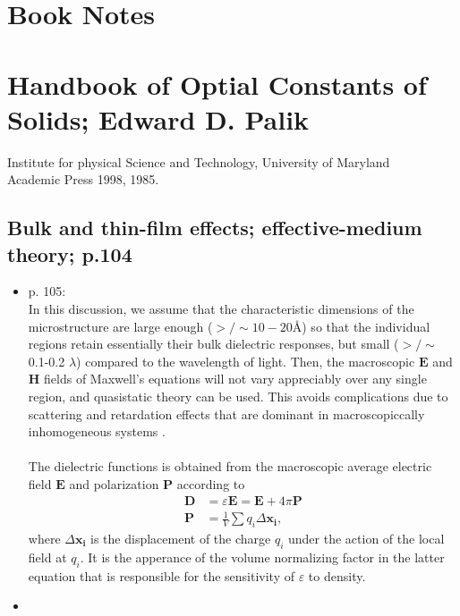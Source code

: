 \section{\textbf{Book Notes}}
\section{Handbook of Optial Constants of Solids; Edward D. Palik}
Institute for physical Science and Technology, University of Maryland\\
Academic Press 1998, 1985.\\

\subsection{Bulk and thin-film effects; effective-medium theory; p.104}
\begin{itemize}
\item p. 105:\\
   In this discussion, we assume that the characteristic dimensions of the microstructure
   are large enough ($>/\sim 10-20 $Å) so that the individual regions retain essentially their bulk dielectric
   responses, but small ($>/\sim$ 0.1-0.2 $\lambda$) compared to the wavelength of light.
   Then, the macroscopic $\boldsymbol E$ and $\boldsymbol H$ fields of Maxwell's equations will not vary
   appreciably over any single region, and quasistatic theory can be used. This avoids complications
   due to scattering and retardation effects that are dominant in macroscopiccally inhomogeneous 
   systems \cite{Beckmann1968}.
   \\
   \\
   The dielectric functions is obtained from the macroscopic average electric field $\boldsymbol E$ and 
   polarization $\boldsymbol P$ according to
   \begin{align}
      \boldsymbol D &= \varepsilon \boldsymbol E = \boldsymbol E+ 4\pi \boldsymbol P \\
      \boldsymbol P &= \frac{1}{V} \sum q_i \Delta\! \boldsymbol{x_i},
   \end{align}
   where $\Delta \! \boldsymbol{x_i}$ is the displacement of the charge $q_i$ under the action of the 
   local field at $q_i$. It is the apperance of the volume normalizing factor in the latter equation
   that is responsible for the sensitivity of $\varepsilon$ to density.
   \item 
\end{itemize}

